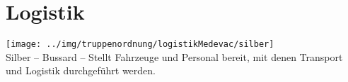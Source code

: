\section{Logistik}
\texttt{[image: ../img/truppenordnung/logistikMedevac/silber]}\\
Silber -- Bussard -- Stellt Fahrzeuge und Personal bereit, mit denen Transport und Logistik durchgeführt werden.